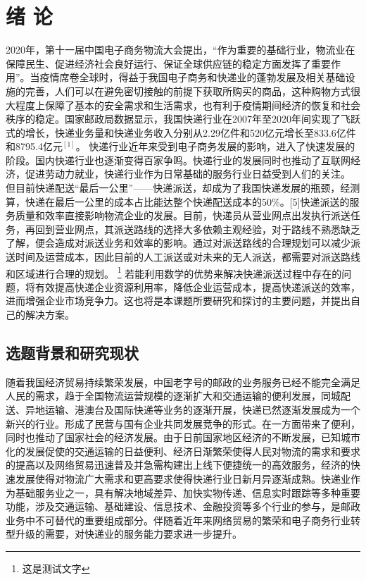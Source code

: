 \clearpage
{}
\setcounter{page}{1}
\section{绪 \quad 论}
\songti{}
\setlength{\baselineskip}{20pt}
2020年，第十一届中国电子商务物流大会提出，“作为重要的基础行业，物流业在保障民生、促进经济社会良好运行、保证全球供应链的稳定方面发挥了重要作用”。当疫情席卷全球时，得益于我国电子商务和快递业的蓬勃发展及相关基础设施的完善，人们可以在避免密切接触的前提下获取所购买的商品，这种购物方式很大程度上保障了基本的安全需求和生活需求，也有利于疫情期间经济的恢复和社会秩序的稳定。国家邮政局数据显示，我国快递行业在2007年至2020年间实现了飞跃式的增长，快递业务量和快递业务收入分别从2.29亿件和520亿元增长至833.6亿件和8795.4亿元$^{[1]}$。
快递行业近年来受到电子商务发展的影响，进入了快速发展的阶段。国内快递行业也逐渐变得百家争鸣。快递行业的发展同时也推动了互联网经济，促进劳动力就业，快递行业作为日常基础的服务行业日益受到人们的关注。 但目前快递配送“最后一公里”——快递派送，却成为了我国快递发展的瓶颈，经测算，快递在最后一公里的成本占比能达整个快递配送成本的50\%。[5]快递派送的服务质量和效率直接影响物流企业的发展。目前，快递员从营业网点出发执行派送任务，再回到营业网点，其派送路线的选择大多依赖主观经验，对于路线不熟悉缺乏了解，便会造成对派送业务和效率的影响。通过对派送路线的合理规划可以减少派送时间及运营成本，因此目前的人工派送或对未来的无人派送，都需要对派送路线和区域进行合理的规划。 \footnote{这是测试文字}
若能利用数学的优势来解决快递派送过程中存在的问题，将有效提高快递企业资源利用率，降低企业运营成本，提高快递派送的效率，进而增强企业市场竞争力。这也将是本课题所要研究和探讨的主要问题，并提出自己的解决方案\cite{knuthwebsite}。

\subsection{选题背景和研究现状}

\par 随着我国经济贸易持续繁荣发展，中国老字号的邮政的业务服务已经不能完全满足人民的需求，趋于全国物流运营规模的逐渐扩大和交通运输的便利发展，同城配送、异地运输、港澳台及国际快递等业务的逐渐开展，快递已然逐渐发展成为一个新兴的行业。形成了民营与国有企业共同发展竞争的形式。在一方面带来了便利，同时也推动了国家社会的经济发展。由于日前国家地区经济的不断发展，已知城市化的发展促使的交通运输的日益便利、经济日渐繁荣使得人民对物流的需求和要求的提高以及网络贸易迅速普及并急需构建出上线下便捷统一的高效服务，经济的快速发展使得对物流广大需求和更高要求使得快递行业日新月异逐渐成熟。快递业作为基础服务业之一，具有解决地域差异、加快实物传递、信息实时跟踪等多种重要功能，涉及交通运输、基础建设、信息技术、金融投资等多个行业的参与，是邮政业务中不可替代的重要组成部分。伴随着近年来网络贸易的繁荣和电子商务行业转型升级的需要，对快递业的服务能力要求进一步提升。\cite{dirac}

